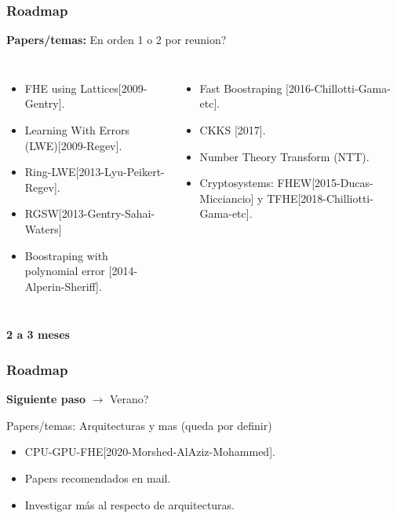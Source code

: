 \documentclass[10pt]{beamer}
\begin{document}
\begin{frame}
\frametitle{Roadmap}
  \textbf{Papers/temas:} En orden 1 o 2  por reunion?

  \vspace{0.3cm}
  \begin{columns}
\begin{itemize}
  \vspace{0.3cm}\item FHE using Lattices[2009-Gentry].
  \vspace{0.3cm}\item Learning With Errors (LWE)[2009-Regev].
  \vspace{0.3cm}\item Ring-LWE[2013-Lyu-Peikert-Regev].
  \vspace{0.3cm}\item RGSW[2013-Gentry-Sahai-Waters]
  \vspace{0.3cm}\item Boostraping with polynomial error [2014-Alperin-Sheriff].
\end{itemize}

\begin{itemize}
  \vspace{0.3cm}\item Fast Boostraping [2016-Chillotti-Gama-etc].
  \vspace{0.3cm}\item CKKS [2017].
  \vspace{0.3cm}\item Number Theory Transform (NTT).
  \vspace{0.3cm}\item Cryptosystems: FHEW[2015-Ducas-Micciancio] y TFHE[2018-Chilliotti-Gama-etc].
\end{itemize}

  \end{columns}

    \vspace{0.5cm}

    \centering
    \textbf{2 a 3 meses}

\end{frame}


\begin{frame}
\frametitle{Roadmap}
  \textbf{Siguiente paso} $\rightarrow$ Verano?

  Papers/temas: Arquitecturas y mas (queda por definir)
\begin{itemize}
    \item CPU-GPU-FHE[2020-Morshed-AlAziz-Mohammed].
    \item Papers recomendados en mail.
    \item Investigar más al respecto de arquitecturas.
\end{itemize}



\end{frame}
\end{document}
